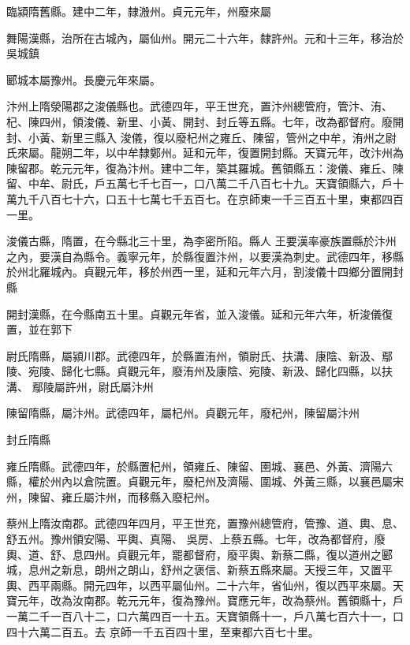 \begin{pinyinscope}
 臨潁隋舊縣。建中二年，隸溵州。貞元元年，州廢來屬



 舞陽漢縣，治所在古城內，屬仙州。開元二十六年，隸許州。元和十三年，移治於吳城鎮



 郾城本屬豫州。長慶元年來屬。



 汴州上隋滎陽郡之浚儀縣也。武德四年，平王世充，置汴州總管府，管汴、洧、杞、陳四州，領浚儀、新里、小黃、開封、封丘等五縣。七年，改為都督府。廢開封、小黃、新里三縣入
 浚儀，復以廢杞州之雍丘、陳留，管州之中牟，洧州之尉氏來屬。龍朔二年，以中牟隸鄭州。延和元年，復置開封縣。天寶元年，改汴州為陳留郡。乾元元年，復為汴州。建中二年，築其羅城。舊領縣五：浚儀、雍丘、陳留、中牟、尉氏，戶五萬七千七百一，口八萬二千八百七十九。天寶領縣六，戶十萬九千八百七十六，口五十七萬七千五百七。在京師東一千三百五十里，東都四百一里。



 浚儀古縣，隋置，在今縣北三十里，為李密所陷。縣人
 王要漢率豪族置縣於汴州之內，要漢自為縣令。義寧元年，於縣復置汴州，以要漢為刺史。武德四年，移縣於州北羅城內。貞觀元年，移於州西一里，延和元年六月，割浚儀十四鄉分置開封縣



 開封漢縣，在今縣南五十里。貞觀元年省，並入浚儀。延和元年六年，析浚儀復置，並在郭下



 尉氏隋縣，屬潁川郡。武德四年，於縣置洧州，領尉氏、扶溝、康陰、新汲、鄢陵、宛陵、歸化七縣。貞觀元年，廢洧州及康陰、宛陵、新汲、歸化四縣，以扶溝、
 鄢陵屬許州，尉氏屬汴州



 陳留隋縣，屬汴州。武德四年，屬杞州。貞觀元年，廢杞州，陳留屬汴州



 封丘隋縣



 雍丘隋縣。武德四年，於縣置杞州，領雍丘、陳留、圉城、襄邑、外黃、濟陽六縣，權於州內以倉院置。貞觀元年，廢杞州及濟陽、圍城、外黃三縣，以襄邑屬宋州，陳留、雍丘屬汴州，而移縣入廢杞州。



 蔡州上隋汝南郡。武德四年四月，平王世充，置豫州總管府，管豫、道、輿、息、舒五州。豫州領安陽、平輿、真陽、
 吳房、上蔡五縣。七年，改為都督府，廢輿、道、舒、息四州。貞觀元年，罷都督府，廢平輿、新蔡二縣，復以道州之郾城，息州之新息，朗州之朗山，舒州之褒信、新蔡五縣來屬。天授三年，又置平輿、西平兩縣。開元四年，以西平屬仙州。二十六年，省仙州，復以西平來屬。天寶元年，改為汝南郡。乾元元年，復為豫州。寶應元年，改為蔡州。舊領縣十，戶一萬二千一百八十二，口六萬四百一十五。天寶領縣十一，戶八萬七百六十一，口四十六萬二百五。去
 京師一千五百四十里，至東都六百七十里。




\end{pinyinscope}
